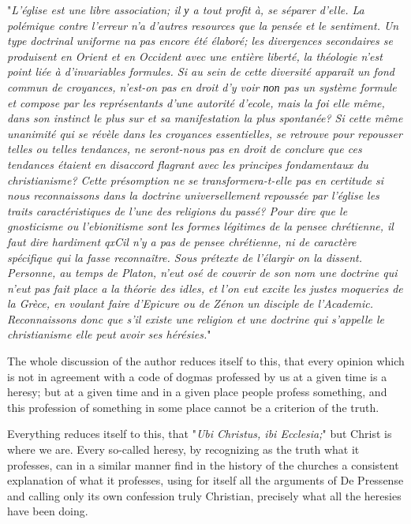 \documentclass{book}
\begin{document}
"\emph{L’église est une libre association; il у a tout profit à, se séparer d’elle. La polémique contre l’erreur n’a d’autres resources que la pensée et le sentiment. Un type doctrinal uniforme na pas encore été élaboré; les divergences secondaires se produisent en Orient et en Occident avec une entière liberté, la théologie n’est point liée à d’invariables formules. Si au sein de cette diversité apparaît un fond commun de croyances, n’est-on pas en droit d’y voir поп pas un système formule et compose par les représentants d’une autorité d’ecole, mais la foi elle même, dans son instinct le plus sur et sa manifestation la plus spontanée? Si cette même unanimité qui se révèle dans les croyances essentielles, se retrouve pour repousser telles ou telles tendances, ne seront-nous pas en droit de conclure que ces tendances étaient en disaccord flagrant avec les principes fondamentaux du christianisme? Cette présomption ne se transformera-t-elle pas en certitude si nous reconnaissons dans la doctrine universellement repoussée par l’église les traits caractéristiques de l’une des religions du passé? Pour dire que le gnosticisme ou l’ebionitisme sont les formes légitimes de la pensee chrétienne, il faut dire hardiment qxCil n’y a pas de pensee chrétienne, ni de caractère spécifique qui la fasse reconnaître. Sous prétexte de l’élargir on la dissent. Personne, au temps de Platon, n’eut osé de couvrir de son nom une doctrine qui n’eut pas fait place a la théorie des idles, et l’on eut excite les justes moqueries de la Grèce, en voulant faire d’Epicure ou de Zénon un disciple de l’Academic. Reconnaissons donc que s’il existe une religion et une doctrine qui s’appelle le christianisme elle peut avoir ses hérésies.}"

The whole discussion of the author reduces itself to this, that every opinion which is not in agreement with a code of dogmas professed by us at a given time is a heresy; but at a given time and in a given place people profess something, and this profession of something in some place cannot be a criterion of the truth.

Everything reduces itself to this, that "\emph{Ubi Christus, ibi Ecclesia;}" but Christ is where we are. Every so-called heresy, by recognizing as the truth what it professes, can in a similar manner find in the history of the churches a consistent explanation of what it professes, using for itself all the arguments of De Pressense and calling only its own confession truly Christian, precisely what all the heresies have been doing.
\end{document}
